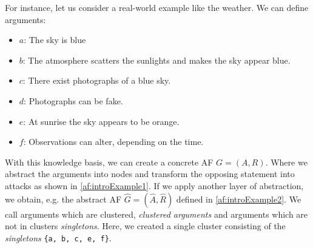 For instance, let us consider a real-world example like the weather. We can define arguments:

\begin{itemize}
    \item $a$: The sky is blue
    \item $b$: The atmosphere scatters the sunlights and makes the sky appear blue. 
    \item $c$: There exist photographs of a blue sky. 
    \item $d$: Photographs can be fake.
    \item $e$: At sunrise the sky appears to be orange. 
    \item $f$: Observations can alter, depending on the time.
\end{itemize}

With this knowledge basis, we can create a concrete AF $G=(A, R)$. Where we abstract the arguments into nodes and transform the opposing statement into attacks as shown in \cref{af:introExample1}. If we apply another layer of abstraction, we obtain, e.g. the abstract AF $\hat{G}=(\hat{A}, \hat{R})$ defined in \cref{af:introExample2}. We call arguments which are clustered, \emph{clustered arguments} and arguments which are not in clusters \emph{singletons}. Here, we created a single cluster consisting of the \emph{singletons} \texttt{\{a, b, c, e, f\}}.



